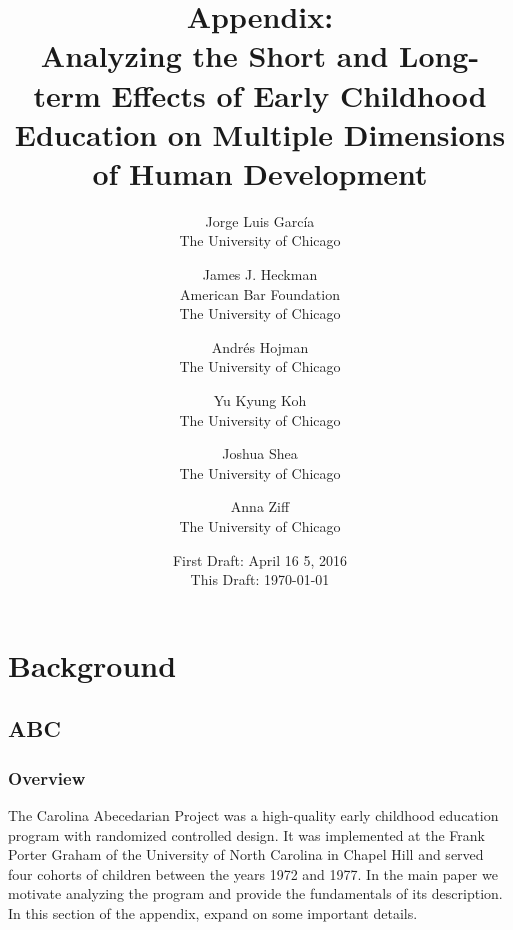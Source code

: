 




\title{\Large \textbf{Appendix: \\ Analyzing the Short and Long-term Effects of Early Childhood Education on Multiple Dimensions of Human Development}}

\author{
Jorge Luis Garc\'{i}a\\
The University of Chicago \and
James J. Heckman \\
American Bar Foundation \\
The University of Chicago \and
Andr\'{e}s Hojman\\
The University of Chicago \and
Yu Kyung Koh \\ 
The University of Chicago \and
Joshua Shea \\
The University of Chicago \and
Anna Ziff \\ 
The University of Chicago}
\date{First Draft: April 16 5, 2016\\ This Draft: \today}
\maketitle

\singlespacing
\pagebreak
\tableofcontents
\listoffigures
\listoftables
\pagebreak

\section{Background}

\subsection{ABC}

\subsubsection{Overview}

\noindent The Carolina Abecedarian Project was a high-quality early childhood education program with randomized controlled design. It was implemented at the Frank Porter Graham of the University of North Carolina in Chapel Hill and served four cohorts of children between the years 1972 and 1977. In the main paper we motivate analyzing the program and provide the fundamentals of its description. In this section of the appendix, expand on some important details.

